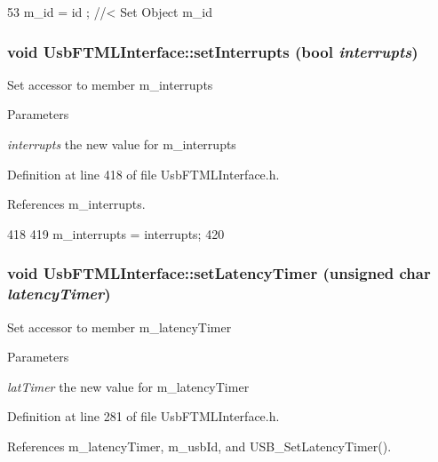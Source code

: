 \begin{DoxyCode}
53 { m_id    = id    ; } //< Set Object m_id
\end{DoxyCode}
\hypertarget{classUsbFTMLInterface_ac82eb9d63d4279998765dcc8c539bba9}{
\subsubsection[{setInterrupts}]{\setlength{\rightskip}{0pt plus 5cm}void UsbFTMLInterface::setInterrupts (bool {\em interrupts})}}
\label{classUsbFTMLInterface_ac82eb9d63d4279998765dcc8c539bba9}
Set accessor to member m\_\-interrupts 
\begin{DoxyParams}{Parameters}
\item[{\em interrupts}]the new value for m\_\-interrupts \end{DoxyParams}


Definition at line 418 of file UsbFTMLInterface.h.

References m\_\-interrupts.


\begin{DoxyCode}
418                                        {
419     m_interrupts = interrupts;
420   }
\end{DoxyCode}
\hypertarget{classUsbFTMLInterface_a3625ccc604bbf5e707b3f5d91bc8f1bb}{
\subsubsection[{setLatencyTimer}]{\setlength{\rightskip}{0pt plus 5cm}void UsbFTMLInterface::setLatencyTimer (unsigned char {\em latencyTimer})}}
\label{classUsbFTMLInterface_a3625ccc604bbf5e707b3f5d91bc8f1bb}
Set accessor to member m\_\-latencyTimer 
\begin{DoxyParams}{Parameters}
\item[{\em latTimer}]the new value for m\_\-latencyTimer \end{DoxyParams}


Definition at line 281 of file UsbFTMLInterface.h.

References m\_\-latencyTimer, m\_\-usbId, and USB\_\-SetLatencyTimer().


